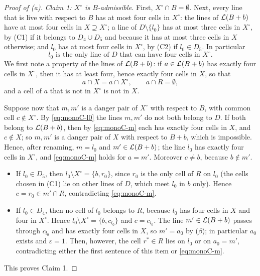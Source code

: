 \begin{proof}[Proof of \textup{(a)}]
\smallskip\noindent\emph{Claim 1: $X^\circ$ is $B$-admissible.}
First, $X^\circ\cap B=\emptyset$. Next, every line that is live with respect to $B$ has at most four cells
in $X^\circ$: the lines of $\mathcal{L}(B+b)$ have at most four cells in $X\supseteq X^\circ$; a line of
$D\setminus\{l_0\}$ has at most three cells in $X^\circ$, by (C1) if it belongs to $D_4\cup D_5$ and
because it has at most three cells in $X$ otherwise; and $l_0$ has at most four cells in $X^\circ$, by
(C2) if $l_0\in D_5$. In particular
\begin{equation}\label{eq:monoC-l0}
  \text{$l_0$ is the only line of $D$ that can have four cells in $X^\circ$.}
\end{equation}
We first note a property of the lines of $\mathcal{L}(B+b)$: if $a\in\mathcal{L}(B+b)$ has exactly four cells in
$X^\circ$, then it has at least four, hence exactly four cells in $X$, so that
\begin{equation}\label{eq:monoC-m}
  a\cap X=a\cap X^\circ,\qquad a\cap R=\emptyset,
\end{equation}
and a cell of $a$ that is not in $X^\circ$ is not in $X$.

Suppose now that $m,m'$ is a danger pair of $X^\circ$ with respect to $B$, with common cell
$c\notin X^\circ$. By \eqref{eq:monoC-l0} the lines $m,m'$ do not both belong to $D$. If both belong to
$\mathcal{L}(B+b)$, then by \eqref{eq:monoC-m} each has exactly four cells in $X$, and $c\notin X$; so $m,m'$ is a
danger pair of $X$ with respect to $B+b$, which is impossible. Hence, after renaming, $m=l_0$ and
$m'\in\mathcal{L}(B+b)$; the line $l_0$ has exactly four cells in $X^\circ$, and \eqref{eq:monoC-m} holds for
$a=m'$. Moreover $c\ne b$, because $b\notin m'$.
\begin{itemize}
\item If $l_0\in D_5$, then $l_0\setminus X^\circ=\{b,r_0\}$, since $r_0$ is the only cell of $R$ on $l_0$
      (the cells chosen in (C1) lie on other lines of $D$, which meet $l_0$ in $b$ only). Hence
      $c=r_0\in m'\cap R$, contradicting \eqref{eq:monoC-m}.
\item If $l_0\in D_4$, then no cell of $l_0$ belongs to $R$, because $l_0$ has four cells in $X$ and four
      in $X^\circ$. Hence $l_0\setminus X^\circ=\{b,c_{l_0}\}$ and $c=c_{l_0}$. The line $m'\in\mathcal{L}(B+b)$
      passes through $c_{l_0}$ and has exactly four cells in $X$, so $m'=a_0$ by ($\beta$); in particular
      $a_0$ exists and $\varepsilon=1$. Then, however, the cell $r^*\in R$ lies on $l_0$ or on $a_0=m'$,
      contradicting either the first sentence of this item or \eqref{eq:monoC-m}.
\end{itemize}
This proves Claim 1.


\end{proof}
